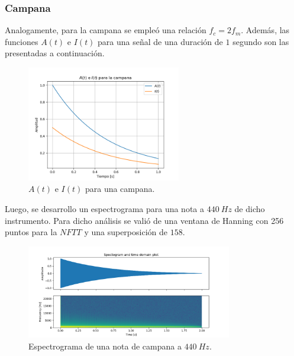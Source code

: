 \subsubsection{Campana}
Analogamente, para la campana se empleó una relación $ f_c = 2 f_m$. Además, las funciones $A(t)$ e $I(t)$ para una señal de una duración de $1$ segundo son las presentadas a continuación.
\begin{figure}[H]
	\centering
	\includegraphics[width=0.6\textwidth]{ImagenesEjercicio3/A-I-Bell.png}
	\caption{$A(t)$ e $I(t)$ para una campana.}
	\label{fig:aibell}
\end{figure}

Luego, se desarrollo un espectrograma para una nota a $440 \ Hz$ de dicho instrumento. Para dicho análisis se valió de una ventana de Hanning con 256 puntos para la $NFTT$ y una superposición de $158$.  
\begin{figure}[H]
	\centering
	\includegraphics[width=0.8\textwidth]{ImagenesEjercicio3/Bell-440-Hanning-256-158.png}
	\caption{Espectrograma de una nota de campana a $440 \ Hz$.}
	\label{fig:specbell}
\end{figure}

